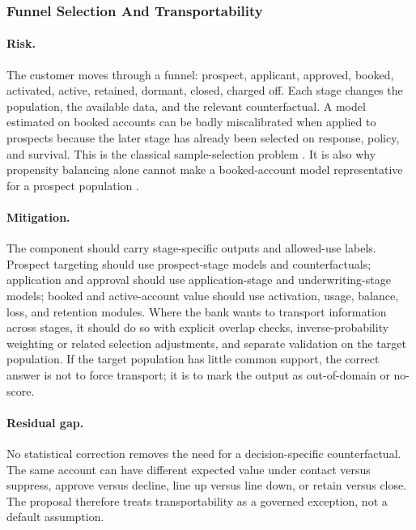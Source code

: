 \documentclass[11pt]{article}
\newcommand{\1}{\mathbf{1}}
\begin{document}
\subsubsection{Funnel Selection And Transportability}

\paragraph{Risk.}
The customer moves through a funnel: prospect, applicant, approved, booked,
activated, active, retained, dormant, closed, charged off. Each stage changes
the population, the available data, and the relevant counterfactual. A model
estimated on booked accounts can be badly miscalibrated when applied to
prospects because the later stage has already been selected on response,
policy, and survival. This is the classical sample-selection problem
\citep{heckman1979selection}. It is also why propensity balancing alone cannot
make a booked-account model representative for a prospect population
\citep{rosenbaum1983propensity,imbenswooldridge2009recent}.

\paragraph{Mitigation.}
The component should carry stage-specific outputs and allowed-use labels.
Prospect targeting should use prospect-stage models and counterfactuals;
application and approval should use application-stage and underwriting-stage
models; booked and active-account value should use activation, usage, balance,
loss, and retention modules. Where the bank wants to transport information
across stages, it should do so with explicit overlap checks, inverse-probability
weighting or related selection adjustments, and separate validation on the
target population. If the target population has little common support, the
correct answer is not to force transport; it is to mark the output as
out-of-domain or no-score.

\paragraph{Residual gap.}
No statistical correction removes the need for a decision-specific
counterfactual. The same account can have different expected value under
contact versus suppress, approve versus decline, line up versus line down, or
retain versus close. The proposal therefore treats transportability as a
governed exception, not a default assumption.
\end{document}
